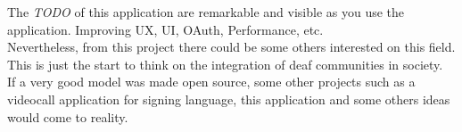 The \textit{TODO} of this application are remarkable and visible as you use the application. Improving UX, UI, OAuth, Performance, etc. \\
Nevertheless, from this project there could be some others interested on this field. This is just the start to think on the integration of deaf communities in society. \\

If a very good model was made open source, some other projects such as a videocall application for signing language, this application and some others ideas would come to reality.
